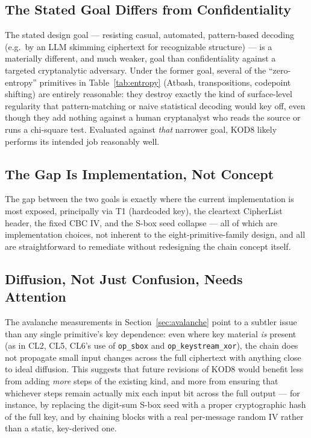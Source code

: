 \documentclass[11pt]{article}
\begin{document}
\subsection{The Stated Goal Differs from Confidentiality}

The stated design goal --- resisting casual, automated, pattern-based
decoding (e.g.\ by an LLM skimming ciphertext for recognizable
structure) --- is a materially different, and much weaker, goal than
confidentiality against a targeted cryptanalytic adversary. Under the
former goal, several of the ``zero-entropy'' primitives in
Table~\ref{tab:entropy} (Atbash, transpositions, codepoint shifting)
are entirely reasonable: they destroy exactly the kind of surface-level
regularity that pattern-matching or naive statistical decoding would
key off, even though they add nothing against a human cryptanalyst who
reads the source or runs a chi-square test. Evaluated against
\emph{that} narrower goal, KOD8 likely performs its intended job
reasonably well.

\subsection{The Gap Is Implementation, Not Concept}

The gap between the two goals is exactly where the current
implementation is most exposed, principally via T1 (hardcoded key), the
cleartext CipherList header, the fixed CBC IV, and the S-box seed
collapse --- all of which are implementation choices, not inherent to the
eight-primitive-family design, and all are straightforward to remediate
without redesigning the chain concept itself.

\subsection{Diffusion, Not Just Confusion, Needs Attention}

The avalanche measurements in Section~\ref{sec:avalanche} point to a
subtler issue than any single primitive's key dependence: even where
key material \emph{is} present (as in CL2, CL5, CL6's use of
\texttt{op\_sbox} and \texttt{op\_keystream\_xor}), the chain does not
propagate small input changes across the full ciphertext with anything
close to ideal diffusion. This suggests that future revisions of KOD8
would benefit less from adding \emph{more} steps of the existing kind,
and more from ensuring that whichever steps remain actually mix each
input bit across the full output --- for instance, by replacing the
digit-sum S-box seed with a proper cryptographic hash of the full key,
and by chaining blocks with a real per-message random IV rather than a
static, key-derived one.
\end{document}
